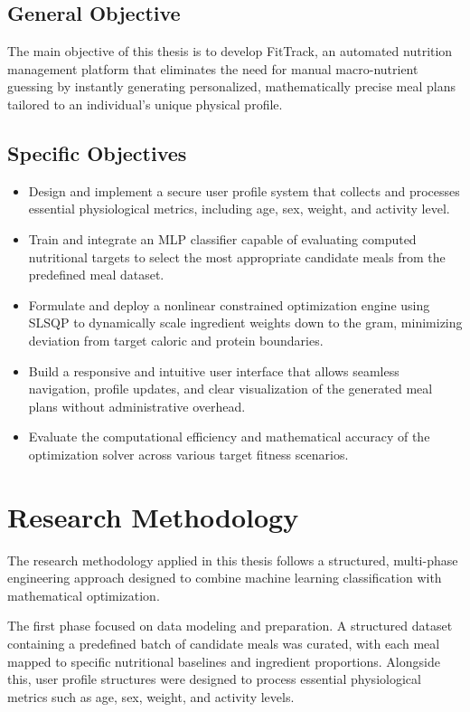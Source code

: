 \subsection{General Objective}

The main objective of this thesis is to develop FitTrack, an automated nutrition 
management platform that eliminates the need for manual macro-nutrient guessing by 
instantly generating personalized, mathematically precise meal plans tailored to 
an individual's unique physical profile.

\subsection{Specific Objectives}

\begin{itemize}
    \item Design and implement a secure user profile system that collects and 
    processes essential physiological metrics, including age, sex, weight, and 
    activity level.
    \item Train and integrate an MLP classifier capable of evaluating computed
    nutritional targets to select the most appropriate candidate meals from the
    predefined meal dataset.
    \item Formulate and deploy a nonlinear constrained optimization engine using
    SLSQP to dynamically scale ingredient weights down to the gram, minimizing
    deviation from target caloric and protein boundaries.
    \item Build a responsive and intuitive user interface that allows seamless 
    navigation, profile updates, and clear visualization of the generated meal 
    plans without administrative overhead.
    \item Evaluate the computational efficiency and mathematical accuracy of the 
    optimization solver across various target fitness scenarios.
\end{itemize}

\section{Research Methodology}

The research methodology applied in this thesis follows a structured, 
multi-phase engineering approach designed to combine machine learning 
classification with mathematical optimization.

The first phase focused on data modeling and preparation. A structured 
dataset containing a predefined batch of candidate meals was curated, 
with each meal mapped to specific nutritional baselines and ingredient 
proportions. Alongside this, user profile structures were designed to 
process essential physiological metrics such as age, sex, weight, and 
activity levels.

